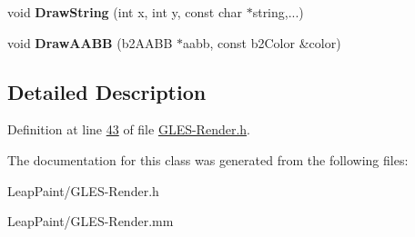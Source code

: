 \begin{DoxyCompactItemize}
\item 
\hypertarget{class_g_l_e_s_debug_draw_a16aaca99009b9423fe288b5815c8dbcf}{void {\bfseries Draw\-String} (int x, int y, const char $\ast$string,...)}\label{d7/da9/class_g_l_e_s_debug_draw_a16aaca99009b9423fe288b5815c8dbcf}

\item 
\hypertarget{class_g_l_e_s_debug_draw_a6dc5d6adbc8279c9d378311b66ddcf53}{void {\bfseries Draw\-A\-A\-B\-B} (b2\-A\-A\-B\-B $\ast$aabb, const b2\-Color \&color)}\label{d7/da9/class_g_l_e_s_debug_draw_a6dc5d6adbc8279c9d378311b66ddcf53}

\end{DoxyCompactItemize}


\subsection{Detailed Description}


Definition at line \hyperlink{_g_l_e_s-_render_8h_source_l00043}{43} of file \hyperlink{_g_l_e_s-_render_8h_source}{G\-L\-E\-S-\/\-Render.\-h}.



The documentation for this class was generated from the following files\-:\begin{DoxyCompactItemize}
\item 
Leap\-Paint/G\-L\-E\-S-\/\-Render.\-h\item 
Leap\-Paint/G\-L\-E\-S-\/\-Render.\-mm\end{DoxyCompactItemize}

